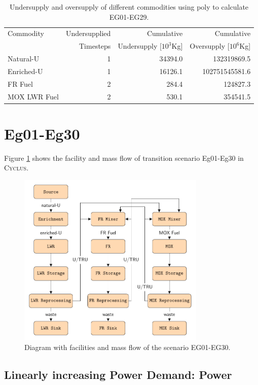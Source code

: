 \documentclass[11pt]{article}
\newcommand{\Cyclus}{\textsc{Cyclus}\xspace}%
\begin{document}
\begin{table}[H]
	\centering
	\caption{Undersupply and oversupply of different commodities using poly to calculate EG01-EG29.}
	\label{tab:29-commod}
	\begin{tabularx}{\textwidth}{lRRR}
		\hline
		Commodity & Undersupplied & Cumulative  & Cumulative \\
		& Timesteps & Undersupply [$10^3$Kg]  & Oversupply [$10^6$Kg] \\ \hline
		Natural-U & 1 & 34394.0  & 132319869.5 \\ 
		Enriched-U & 1 & 16126.1 & 102751545581.6 \\
		FR Fuel & 2 & 284.4 & 124827.3 \\
        MOX LWR Fuel & 2 & 530.1 & 354541.5 \\ \hline
	\end{tabularx}
\end{table}

\section{Eg01-Eg30}

Figure \ref{fig:30flow} shows the facility and mass flow of transition scenario 
Eg01-Eg30 in \Cyclus.

\begin{figure}[H]
	\centering
	\includegraphics[width=0.8\textwidth]{30-figures/30flow.pdf} 
	\hfill
	\caption{Diagram with facilities and mass flow of the scenario EG01-EG30.}
	\label{fig:30flow}
\end{figure}

\subsection{Linearly increasing Power Demand: Power}
\end{document}
